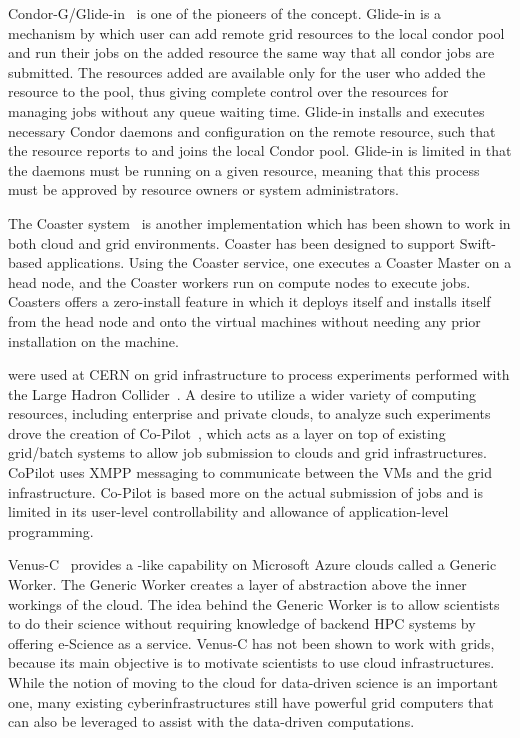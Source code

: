 \documentclass{sig-alternate}
\begin{document}
Condor-G/Glide-in~\cite{condor-g} is one of the pioneers of the \pilotjob
concept. Glide-in is a mechanism by which user can add remote grid resources
to the local condor pool and run their jobs on the added resource the same way
that all condor jobs are submitted. The resources added are available only for
the user who added the resource to the pool, thus giving complete control over
the resources for managing jobs without any queue waiting time. Glide-in
installs and executes necessary Condor daemons and configuration on the remote
resource, such that the resource reports to and joins the local Condor pool.
Glide-in is limited in that the daemons must be running on a given resource,
meaning that this process must be approved by resource owners or system
administrators.

The Coaster system~\cite{coasters} is another \pilotjob implementation
which has been shown to work in both cloud and grid
environments. Coaster has been designed to support Swift-based applications. 
Using the Coaster service, one executes a Coaster Master
on a head node, and the Coaster workers run on compute nodes to
execute jobs. Coasters offers a zero-install feature in which it
deploys itself and installs itself from the head node and onto the
virtual machines without needing any prior installation on the
machine. 

\pilotjobs were used at CERN on grid infrastructure to process experiments 
performed with the Large Hadron Collider~\cite{copilot-tr}. 
A desire to utilize a wider variety of computing resources, including 
enterprise and private clouds, to analyze such experiments drove the creation 
of Co-Pilot~\cite{copilot-tr}, which acts as a layer on top of existing
grid/batch systems to allow job submission to clouds and grid infrastructures. 
CoPilot uses XMPP messaging to communicate between the VMs and the grid 
infrastructure. Co-Pilot is based more on the actual
submission of jobs and is limited in its user-level controllability and 
allowance of application-level programming.

Venus-C~\cite{venusc-generic-worker} provides a \pilotjob-like
capability on Microsoft Azure clouds called a Generic Worker. The
Generic Worker creates a layer of abstraction above the inner workings
of the cloud.  The idea behind the Generic Worker is to allow
scientists to do their science without requiring knowledge of backend
HPC systems by offering e-Science as a service. Venus-C has not been
shown to work with grids, because its main objective is to motivate
scientists to use cloud infrastructures.  While the notion of moving
to the cloud for data-driven science is an important one, many
existing cyberinfrastructures still have powerful grid computers that
can also be leveraged to assist with the data-driven computations.
\end{document}
